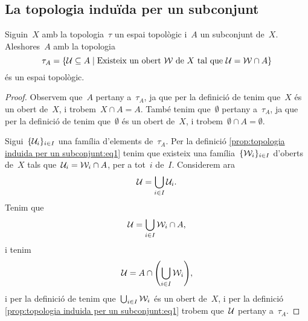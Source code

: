 \documentclass[../../main.tex]{subfiles}
\begin{document}
    \subsection{La topologia induïda per un subconjunt}
    \begin{proposition}
        \label{prop:topologia induida per un subconjunt}
        Siguin~\(X\) amb la topologia~\(\tau\) un espai topològic i~\(A\) un subconjunt de~\(X\).
        Aleshores~\(A\) amb la topologia
        \begin{equation}
            \label{prop:topologia induida per un subconjunt:eq1}
            \tau_{A}=\{\mathcal{U}\subseteq A\mid\text{Existeix un obert }\mathcal{W}\text{ de }X\text{ tal que }\mathcal{U}=\mathcal{W}\cap A\}
        \end{equation}
        és un espai topològic.
        \begin{proof}
            Observem que~\(A\) pertany a~\(\tau_{A}\), ja que per la definició de  tenim que~\(X\) és un obert de~\(X\), i trobem~\(X\cap A=A\).
            També tenim que~\(\emptyset\) pertany a~\(\tau_{A}\), ja que per la definició de  tenim que~\(\emptyset\) és un obert de~\(X\), i trobem~\(\emptyset\cap A=\emptyset\).

            Sigui~\(\{\mathcal{U}_{i}\}_{i\in I}\) una família d'elements de~\(\tau_{A}\).
            Per la definició \eqref{prop:topologia induida per un subconjunt:eq1} tenim que existeix una família~\(\{\mathcal{W}_{i}\}_{i\in I}\) d'oberts de~\(X\) tals que~\(\mathcal{U}_{i}=\mathcal{W}_{i}\cap A\), per a tot~\(i\) de~\(I\).
            Considerem ara
            \[
                \mathcal{U}=\bigcup_{i\in I}\mathcal{U}_{i}.
            \]
            Tenim que
            \[
                \mathcal{U}=\bigcup_{i\in I}\mathcal{W}_{i}\cap A,
            \]
            i tenim
            \[
                \obert{U}=A\cap\left(\bigcup_{i\in I}\obert{W}_{i}\right),
            \]
            i per la definició de  tenim que~\(\bigcup_{i\in I}\mathcal{W}_{i}\) és un obert de~\(X\), i per la definició \eqref{prop:topologia induida per un subconjunt:eq1} trobem que~\(\mathcal{U}\) pertany a~\(\tau_{A}\).


\end{proof}
\end{proposition}
\end{document}

